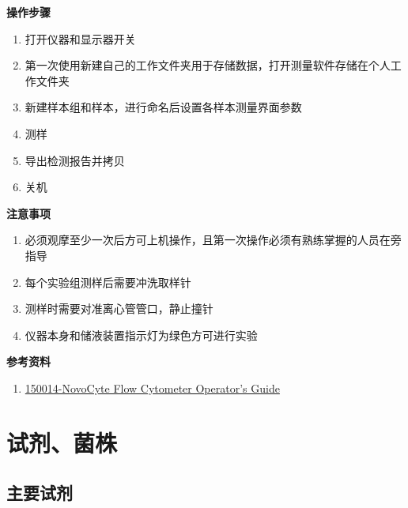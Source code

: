 \documentclass[
]{book}
\providecommand{\tightlist}{%
  \setlength{\itemsep}{0pt}\setlength{\parskip}{0pt}}
\begin{document}
\textbf{操作步骤}

\begin{enumerate}
\def\labelenumi{\arabic{enumi}.}
\tightlist
\item
  打开仪器和显示器开关
\item
  第一次使用新建自己的工作文件夹用于存储数据，打开测量软件存储在个人工作文件夹
\item
  新建样本组和样本，进行命名后设置各样本测量界面参数
\item
  测样
\item
  导出检测报告并拷贝
\item
  关机
\end{enumerate}

\textbf{注意事项}

\begin{enumerate}
\def\labelenumi{\arabic{enumi}.}
\tightlist
\item
  必须观摩至少一次后方可上机操作，且第一次操作必须有熟练掌握的人员在旁指导
\item
  每个实验组测样后需要冲洗取样针
\item
  测样时需要对准离心管管口，静止撞针
\item
  仪器本身和储液装置指示灯为绿色方可进行实验
\end{enumerate}

\textbf{参考资料}

\begin{enumerate}
\def\labelenumi{\arabic{enumi}.}
\tightlist
\item
  \href{https://www.agilent.com.cn/cs/library/usermanuals/public/150014-NovoCyte\%20Flow\%20Cytometer\%20Operator\textquotesingle{}s\%20Guide\%20(RUO).pdf}{150014-NovoCyte Flow Cytometer Operator's Guide}
\end{enumerate}

\hypertarget{materials}{%
\chapter{试剂、菌株}\label{materials}}

\hypertarget{ux4e3bux8981ux8bd5ux5242}{%
\section{主要试剂}\label{ux4e3bux8981ux8bd5ux5242}}
\end{document}
